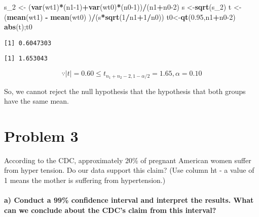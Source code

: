\documentclass[
]{article}
\newenvironment{Shaded}{\begin{snugshade}}{\end{snugshade}}
\newcommand{\DecValTok}[1]{\textcolor[rgb]{0.00,0.00,0.81}{#1}}
\newcommand{\FloatTok}[1]{\textcolor[rgb]{0.00,0.00,0.81}{#1}}
\newcommand{\FunctionTok}[1]{\textcolor[rgb]{0.13,0.29,0.53}{\textbf{#1}}}
\newcommand{\NormalTok}[1]{#1}
\newcommand{\OtherTok}[1]{\textcolor[rgb]{0.56,0.35,0.01}{#1}}
\newcommand{\SpecialCharTok}[1]{\textcolor[rgb]{0.81,0.36,0.00}{\textbf{#1}}}
\begin{document}
\begin{Shaded}
\begin{Highlighting}[]
\NormalTok{s\_2 }\OtherTok{\textless{}{-}}\NormalTok{ (}\FunctionTok{var}\NormalTok{(wt1)}\SpecialCharTok{*}\NormalTok{(n1}\DecValTok{{-}1}\NormalTok{)}\SpecialCharTok{+}\FunctionTok{var}\NormalTok{(wt0)}\SpecialCharTok{*}\NormalTok{(n0}\DecValTok{{-}1}\NormalTok{))}\SpecialCharTok{/}\NormalTok{(n1}\SpecialCharTok{+}\NormalTok{n0}\DecValTok{{-}2}\NormalTok{)}
\NormalTok{s }\OtherTok{\textless{}{-}}\FunctionTok{sqrt}\NormalTok{(s\_2)}
\NormalTok{t }\OtherTok{\textless{}{-}}\NormalTok{ (}\FunctionTok{mean}\NormalTok{(wt1) }\SpecialCharTok{{-}} \FunctionTok{mean}\NormalTok{(wt0) )}\SpecialCharTok{/}\NormalTok{(s}\SpecialCharTok{*}\FunctionTok{sqrt}\NormalTok{(}\DecValTok{1}\SpecialCharTok{/}\NormalTok{n1}\SpecialCharTok{+}\DecValTok{1}\SpecialCharTok{/}\NormalTok{n0))}
\NormalTok{t0}\OtherTok{\textless{}{-}}\FunctionTok{qt}\NormalTok{(}\FloatTok{0.95}\NormalTok{,n1}\SpecialCharTok{+}\NormalTok{n0}\DecValTok{{-}2}\NormalTok{)}
\FunctionTok{abs}\NormalTok{(t);t0}
\end{Highlighting}
\end{Shaded}

\begin{verbatim}
[1] 0.6047303
\end{verbatim}

\begin{verbatim}
[1] 1.653043
\end{verbatim}

\[\because |t|=0.60 \le t_{n_1+n_2-2,1-\alpha/2} = 1.65,\alpha = 0.10\]

So, we cannot reject the null hypothesis that the hypothesis that both
groups have the same mean.

\hypertarget{problem-3}{%
\section{Problem 3}\label{problem-3}}

According to the CDC, approximately 20\% of pregnant American women
suffer from hypertension. Do our data support this claim? (Use column ht
- a value of 1 means the mother is suffering from hypertension.)

\hypertarget{a-conduct-a-99-confidence-interval-and-interpret-the-results.-what-can-we-conclude-about-the-cdcs-claim-from-this-interval}{%
\paragraph{a) Conduct a 99\% confidence interval and interpret the
results. What can we conclude about the CDC's claim from this
interval?}\label{a-conduct-a-99-confidence-interval-and-interpret-the-results.-what-can-we-conclude-about-the-cdcs-claim-from-this-interval}}
\end{document}
